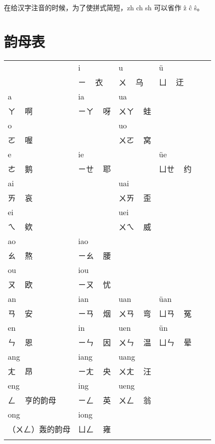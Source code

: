 \documentclass[zihao=-4,fontset=none]{ctexart}
\begin{document}
在给汉字注音的时候，为了使拼式简短，zh ch sh 可以省作 ẑ ĉ ŝ。

\section{韵母表}

\begin{center}
  \begin{tabular}{Vp{4cm}|p{2.5cm}|p{2.5cm}|p{2.5cm}V}
        & i    & u    & ü   \\                  & ㄧ   ~ 衣 & ㄨ   ~ 乌 & ㄩ   ~ 迂 \\ \hline
    a   & ia   & ua   &     \\ ㄚ ~ 啊          & ㄧㄚ ~ 呀 & ㄨㄚ ~ 蛙 &           \\ \hline
    o   &      & uo   &     \\ ㄛ ~ 喔          &           & ㄨㄛ ~ 窝 &           \\ \hline
    e   & ie   &      & üe  \\ ㄜ ~ 鹅          & ㄧㄝ ~ 耶 &           & ㄩㄝ ~ 约 \\ \hline
    ai  &      & uai  &     \\ ㄞ ~ 哀          &           & ㄨㄞ ~ 歪 &           \\ \hline
    ei  &      & uei  &     \\ ㄟ ~ 欸          &           & ㄨㄟ ~ 威 &           \\ \hline
    ao  & iao  &      &     \\ ㄠ ~ 熬          & ㄧㄠ ~ 腰 &           &           \\ \hline
    ou  & iou  &      &     \\ ㄡ ~ 欧          & ㄧㄡ ~ 忧 &           &           \\ \hline
    an  & ian  & uan  & üan \\ ㄢ ~ 安          & ㄧㄢ ~ 烟 & ㄨㄢ ~ 弯 & ㄩㄢ ~ 冤 \\ \hline
    en  & in   & uen  & ün  \\ ㄣ ~ 恩          & ㄧㄣ ~ 因 & ㄨㄣ ~ 温 & ㄩㄣ ~ 晕 \\ \hline
    ang & iang & uang &     \\ ㄤ ~ 昂          & ㄧㄤ ~ 央 & ㄨㄤ ~ 汪 &           \\ \hline
    eng & ing  & ueng &     \\ ㄥ ~ 亨的韵母    & ㄧㄥ ~ 英 & ㄨㄥ ~ 翁 &           \\ \hline
    ong & iong &      &     \\ （ㄨㄥ）轰的韵母 & ㄩㄥ ~ 雍 &           &           \\
  \end{tabular}
\end{center}
\end{document}
